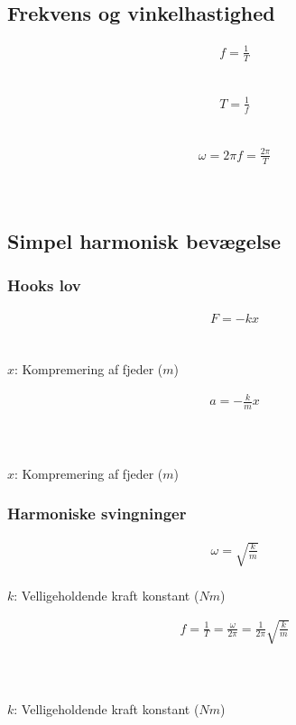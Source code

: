 \subsection{Frekvens og vinkelhastighed}
	\begin{align}
		f=\frac{1}{T}
	\end{align}
	\frekvens\\
	\periode

	\begin{align}
		T=\frac{1}{f}
	\end{align}
	\frekvens\\
	\periode

	\begin{align}
		\omega=2\pi f=\frac{2\pi}{T}
	\end{align}
	\vinkelhast\\
	\frekvens\\
	\periode

\subsection{Simpel harmonisk bevægelse}
	\subsubsection{Hooks lov}
		\begin{align}
			F=-kx
		\end{align}
		\kraft\\
		\fjederkonstant\\
		$x$: Kompremering af fjeder ($m$)

		\begin{align}
			a=-\frac{k}{m}x
		\end{align}
		\acc\\
		\fjederkonstant\\
		\masse\\
		$x$: Kompremering af fjeder ($m$)

	\subsubsection{Harmoniske svingninger}
		\begin{align}
			\omega=\sqrt{\frac{k}{m}}
		\end{align}
		\vinkelhast\\
		$k$: Velligeholdende kraft konstant ($Nm$)\\
		\masse

		\begin{align}
			f=\frac{1}{T}=\frac{\omega}{2\pi}=\frac{1}{2\pi}\sqrt{\frac{k}{m}}
		\end{align}
		\frekvens\\
		\periode\\
		\vinkelhast\\
		$k$: Velligeholdende kraft konstant ($Nm$)\\
		\masse

